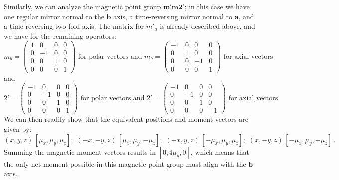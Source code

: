 Similarly, we can analyze the magnetic point group $\mathbf{m'm2'}$; in this case we have one regular mirror normal to the $\mathbf{b}$ axis, a time-reversing mirror normal to $\mathbf{a}$, and a time reversing two-fold axis. 
The matrix for $m'_a$ is already described above, and we have for the remaining operators:
\[
	m_b = \begin{pmatrix} 1 & 0 & 0 & 0\\ 0 & -1 & 0 & 0\\ 0  & 0 & 1 & 0\\ 0&0&0&1\end{pmatrix}
\text{ for polar vectors and }	m_b = \begin{pmatrix}-1 & 0 & 0 & 0\\ 0 & 1 & 0 & 0\\ 0  & 0 & -1 & 0\\ 0&0&0&1\end{pmatrix}\text{ for axial vectors}
\]
and
\[
	2' = \begin{pmatrix}-1 & 0 & 0 & 0\\ 0 & -1 & 0 & 0\\ 0  & 0 & 1 & 0\\ 0&0&0&1\end{pmatrix}
\text{ for polar vectors and }	2' = \begin{pmatrix}-1 & 0 & 0 & 0\\ 0 &-1 & 0 & 0\\ 0  & 0 & 1 & 0\\ 0&0&0&-1\end{pmatrix}\text{ for axial vectors}
\]
We can then readily show that the equivalent positions and moment vectors are given by:
{\small\begin{equation*}
	(x,y,z)\,[\mu_x,\mu_y,\mu_z];\,\, (-x,-y,z)\,[\mu_x,\mu_y,-\mu_z];\,\, (-x,y,z)\, [-\mu_x,\mu_y,\mu_z]; \,\, (x,-y,z)\,[-\mu_x,\mu_y,-\mu_z]\ .
\end{equation*}}
Summing the magnetic moment vectors results in $[0,4\mu_y,0]$, which means that the only net moment possible in this magnetic point group must align with the $\mathbf{b}$ axis. 


